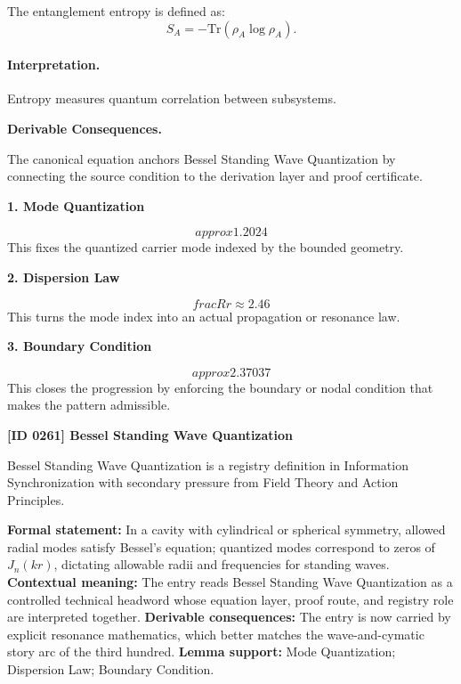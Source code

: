 The entanglement entropy is defined as:
\begin{equation}
S_A = -\mathrm{Tr}(\rho_A \log \rho_A).
\end{equation}

\paragraph{Interpretation.}
Entropy measures quantum correlation between subsystems.

\par\vspace{0.35em}
\noindent\textbf{Derivable Consequences.}\quad
\begingroup
\footnotesize
\raggedright
The canonical equation anchors Bessel Standing Wave Quantization by connecting the source condition to the derivation layer and proof certificate.
\par\endgroup

\noindent\textbf{1. Mode Quantization}\par
\[
approx1.2024
\]
\noindent This fixes the quantized carrier mode indexed by the bounded geometry.\par
\noindent\textbf{2. Dispersion Law}\par
\[
frac{R}{r}\approx2.46
\]
\noindent This turns the mode index into an actual propagation or resonance law.\par
\noindent\textbf{3. Boundary Condition}\par
\[
approx2.37037
\]
\noindent This closes the progression by enforcing the boundary or nodal condition that makes the pattern admissible.\par

\clearpage
\noindent\textbf{[ID 0261] Bessel Standing Wave Quantization}\par
\vspace{0.35em}
\begingroup\small
{}
Bessel Standing Wave Quantization is a registry definition in Information Synchronization with secondary pressure from Field Theory and Action Principles.

\begingroup\footnotesize\setlength{\emergencystretch}{3em}\sloppy
\textbf{Formal statement:} In a cavity with cylindrical or spherical symmetry, allowed radial modes satisfy Bessel's equation; quantized modes correspond to zeros of \(J_n(kr)\), dictating allowable radii and frequencies for standing waves. \textbf{Contextual meaning:} The entry reads Bessel Standing Wave Quantization as a controlled technical headword whose equation layer, proof route, and registry role are interpreted together. \textbf{Derivable consequences:} The entry is now carried by explicit resonance mathematics, which better matches the wave-and-cymatic story arc of the third hundred. \textbf{Lemma support:} Mode Quantization; Dispersion Law; Boundary Condition.\par
\endgroup


